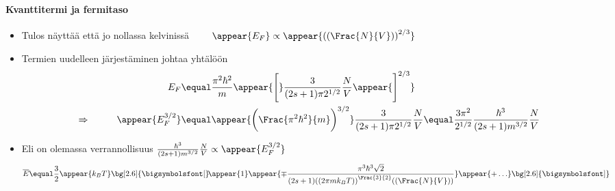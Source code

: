 \begin{frame}
\frametitle{\texorpdfstring{\culine[\sectiontitleulinecolor]{\sectiontitle}}{\sectiontitle} }
\framesubtitle{Kvanttitermi ja fermitaso}
\appear{}
\begin{itemize}
	\item Tulos näyttää että jo nollassa kelvinissä $\qquad \appear{E_{F}} \propto \appear{\textrm{((}\Frac{N}{V} \textrm{))}^{2 / 3}}$

\item Termien uudelleen järjestäminen johtaa yhtälöön 
\[
\begin{aligned}
& & E_{F}  &\equal \frac{\pi^{2} \hbar^{2}}{m} \appear{\Bigg[}\frac{3}{(2 s+1) \pi 2^{1/2}} \frac{N}{V} \appear{\Bigg]^{2 / 3}} \\
&\Rightarrow& \qquad \appear{E_{F}^{3 / 2}}  &\equal  \appear{ \bigg( \Frac{\pi^{2} \hbar^{2}}{m}  \bigg)^{3 / 2}} \frac{3}{(2 s+1) \pi 2^{1/2}} \frac{N}{V}  \equal  \frac{3 \pi^{2}}{2^{1/2}} \frac{\hbar^{3}}{(2 s+1) m^{3 / 2}} \frac{N}{V}
\end{aligned}
\]
\item Eli on olemassa verrannollisuus $\frac{\hbar^{3}}{(2 s+1) m^{3 / 2}} \frac{N}{V} \propto \appear{E_{F}^{3 / 2}}$ 
\[
\overline{E}  \equal \frac{3}{2} \appear{k_{B} T} \bg[2.6]{\text{\bigsymbolsfont[}}\! \appear{1} \appear{\mp \frac{\pi^{3} \hbar^{3} \sqrt{2}}{(2 s+1) \textrm{((}2 \pi m k_{B} T \textrm{))}^{\Frac{3}{2}} \textrm{((}\Frac{N}{V} \textrm{))} } } \appear{+\ldots} \bg[2.6]{\text{\bigsymbolsfont]}}
\]
\end{itemize}

\endofslide 
\end{frame}

